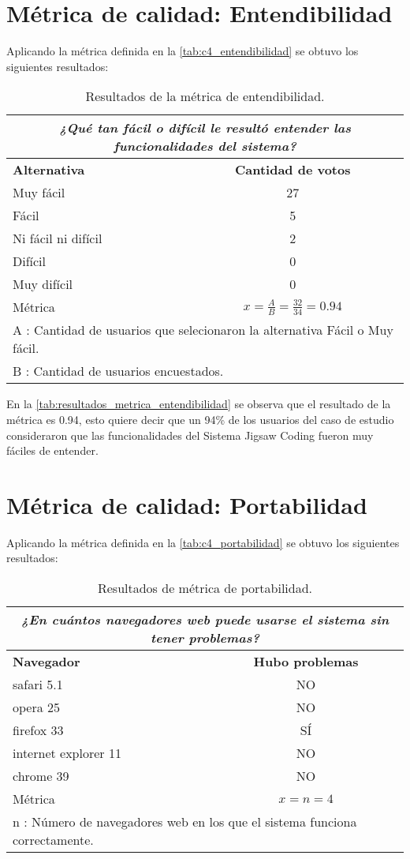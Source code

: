 \section{Métrica de calidad: Entendibilidad}
Aplicando la métrica definida en la \autoref{tab:c4_entendibilidad} se obtuvo los siguientes resultados:

\begin{longtable}{lc}
	\caption{Resultados de la métrica de entendibilidad.}
	\label{tab:resultados_metrica_entendibilidad}\\
	\toprule[0.7mm]
	\multicolumn{2}{c}{\emph{¿Qué tan fácil o difícil le resultó entender las funcionalidades del sistema?}}\\
	\midrule
	\textbf{Alternativa} & \textbf{Cantidad de votos} \\
	\midrule
	Muy fácil & 27 \\
	Fácil & 5 \\
	Ni fácil ni difícil & 2 \\
	Difícil & 0 \\
	Muy difícil & 0 \\
	\midrule
	Métrica & $x = \frac{A}{B} = \frac{32}{34} = 0.94$		\\
	\multicolumn{2}{l}{A : Cantidad de usuarios que selecionaron la alternativa Fácil o Muy fácil.}\\
	\multicolumn{2}{l}{B : Cantidad de usuarios encuestados.}\\
	\bottomrule[0.7mm]
\end{longtable}

En la \autoref{tab:resultados_metrica_entendibilidad} se observa que el resultado de la métrica es 0.94, esto quiere decir que un 94\% de los usuarios del caso de estudio consideraron que las funcionalidades del Sistema Jigsaw Coding fueron muy fáciles de entender.

\section{Métrica de calidad: Portabilidad}
Aplicando la métrica definida en la \autoref{tab:c4_portabilidad} se obtuvo los siguientes resultados:

\begin{longtable}{lc}
	\caption{Resultados de métrica de portabilidad.}
	\label{tab:resultados_metrica_portabilidad}\\
	\toprule[0.7mm]
	\multicolumn{2}{c}{\emph{¿En cuántos navegadores web puede usarse el sistema sin tener problemas?}}\\
	\midrule
	\textbf{Navegador} & \textbf{Hubo problemas} \\
	\midrule
	safari 5.1 &  NO \\
	opera 25 & NO \\
	firefox 33 & SÍ \\
	internet explorer 11 & NO \\
	chrome 39 & NO \\
	\midrule
	Métrica & $x = n = 4$		\\
	\multicolumn{2}{l}{n : Número de navegadores web en los que el sistema funciona correctamente.}\\
	\bottomrule[0.7mm]
\end{longtable}

